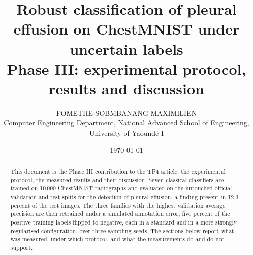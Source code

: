 \documentclass[10pt,twocolumn,a4paper]{article}
\title{\vspace{-8mm}\large Robust classification of pleural effusion on
ChestMNIST under uncertain labels\\[2pt]
\normalsize Phase III: experimental protocol, results and discussion}
\author{\normalsize FOMETHE SOBMBANANG MAXIMILIEN\\[-1pt]
\small Computer Engineering Department, National Advanced School of Engineering,
University of Yaound\'e I}
\date{\small \today}
\begin{document}
\maketitle

\begin{abstract}
\noindent
This document is the Phase III contribution to the TP4 article: the experimental
protocol, the measured results and their discussion. Seven classical
classifiers are trained on 10\,000 ChestMNIST radiographs and evaluated on the
untouched official validation and test splits for the detection of pleural
effusion, a finding present in 12.3 percent of the test images. The three
families with the highest validation average precision are then retrained under
a simulated annotation error, five percent of the positive training labels
flipped to negative, each in a standard and in a more strongly regularised
configuration, over three sampling seeds. The sections below report what was
measured, under which protocol, and what the measurements do and do not
support.
\end{abstract}





\end{document}
